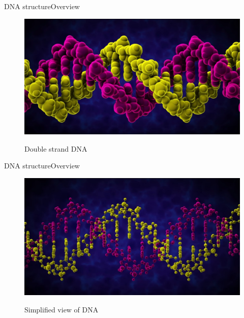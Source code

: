 \documentclass[10pt]{beamer}
\begin{document}
{%
\begin{frame}{DNA structure}{Overview}
	\begin{figure}[]
		\centering
		\includegraphics[width=\textwidth,height=0.7\textheight,keepaspectratio]{img/introduction/dna2.jpg}
		\label{img:mot2}
		\caption{Double strand DNA}
	\end{figure}
\end{frame}

\begin{frame}{DNA structure}{Overview}
	\begin{figure}[]
		\centering
		\includegraphics[width=\textwidth,height=0.7\textheight,keepaspectratio]{img/introduction/dna3.jpg}
		\label{img:mot2}
		\caption{Simplified view of DNA}
	\end{figure}
\end{frame}

}
\end{document}
